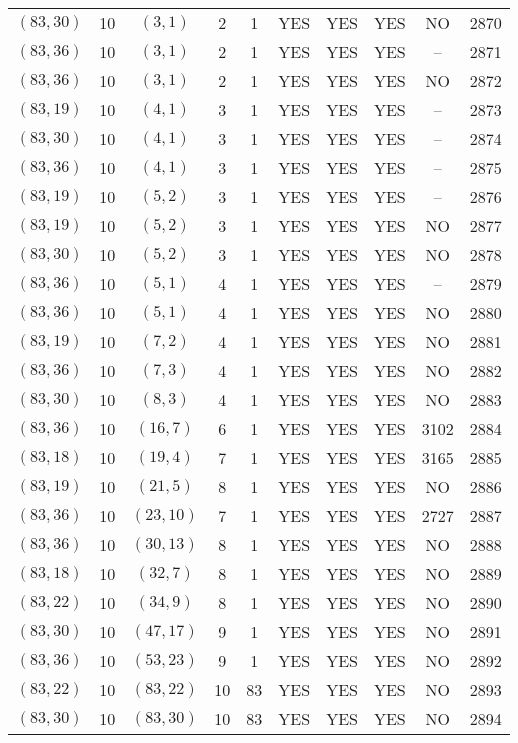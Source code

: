 \begin{longtable}{|c|c|c|c|c|c|c|c|c|c|}
$(83, 30)$ & 10 & $(3, 1)$ & 2 & 1 & YES & YES & YES & NO & 2870\\
$(83, 36)$ & 10 & $(3, 1)$ & 2 & 1 & YES & YES & YES & -- & 2871\\
$(83, 36)$ & 10 & $(3, 1)$ & 2 & 1 & YES & YES & YES & NO & 2872\\
$(83, 19)$ & 10 & $(4, 1)$ & 3 & 1 & YES & YES & YES & -- & 2873\\
$(83, 30)$ & 10 & $(4, 1)$ & 3 & 1 & YES & YES & YES & -- & 2874\\
$(83, 36)$ & 10 & $(4, 1)$ & 3 & 1 & YES & YES & YES & -- & 2875\\
$(83, 19)$ & 10 & $(5, 2)$ & 3 & 1 & YES & YES & YES & -- & 2876\\
$(83, 19)$ & 10 & $(5, 2)$ & 3 & 1 & YES & YES & YES & NO & 2877\\
$(83, 30)$ & 10 & $(5, 2)$ & 3 & 1 & YES & YES & YES & NO & 2878\\
$(83, 36)$ & 10 & $(5, 1)$ & 4 & 1 & YES & YES & YES & -- & 2879\\
$(83, 36)$ & 10 & $(5, 1)$ & 4 & 1 & YES & YES & YES & NO & 2880\\
$(83, 19)$ & 10 & $(7, 2)$ & 4 & 1 & YES & YES & YES & NO & 2881\\
$(83, 36)$ & 10 & $(7, 3)$ & 4 & 1 & YES & YES & YES & NO & 2882\\
$(83, 30)$ & 10 & $(8, 3)$ & 4 & 1 & YES & YES & YES & NO & 2883\\
$(83, 36)$ & 10 & $(16, 7)$ & 6 & 1 & YES & YES & YES & 3102 & 2884\\
$(83, 18)$ & 10 & $(19, 4)$ & 7 & 1 & YES & YES & YES & 3165 & 2885\\
$(83, 19)$ & 10 & $(21, 5)$ & 8 & 1 & YES & YES & YES & NO & 2886\\
$(83, 36)$ & 10 & $(23, 10)$ & 7 & 1 & YES & YES & YES & 2727 & 2887\\
$(83, 36)$ & 10 & $(30, 13)$ & 8 & 1 & YES & YES & YES & NO & 2888\\
$(83, 18)$ & 10 & $(32, 7)$ & 8 & 1 & YES & YES & YES & NO & 2889\\
$(83, 22)$ & 10 & $(34, 9)$ & 8 & 1 & YES & YES & YES & NO & 2890\\
$(83, 30)$ & 10 & $(47, 17)$ & 9 & 1 & YES & YES & YES & NO & 2891\\
$(83, 36)$ & 10 & $(53, 23)$ & 9 & 1 & YES & YES & YES & NO & 2892\\
$(83, 22)$ & 10 & $(83, 22)$ & 10 & 83 & YES & YES & YES & NO & 2893\\
$(83, 30)$ & 10 & $(83, 30)$ & 10 & 83 & YES & YES & YES & NO & 2894\\

\end{longtable}
